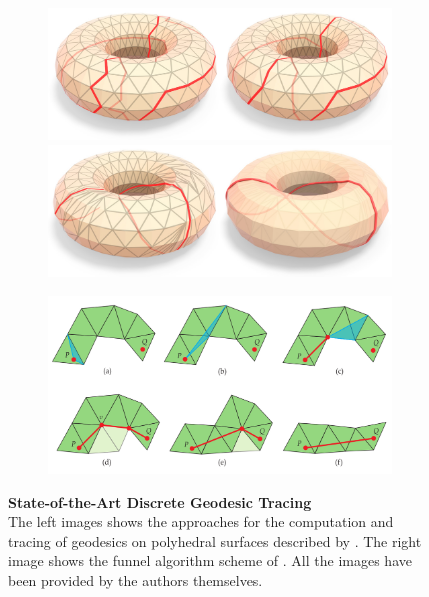 \documentclass{stdlocal}
\begin{document}
\begin{figure}[t]
  \centering
  \begin{subfigure}[b]{0.4\textwidth}
    \centering
    \begin{minipage}{\linewidth}
      \includegraphics[width=\linewidth]{images/sharp2020-2.png} \\
      \includegraphics[width=\linewidth]{images/sharp2020-1.png}
    \end{minipage}
    \caption{\textcite{sharp2020}}
  \end{subfigure}
  \begin{subfigure}[b]{0.58\textwidth}
    \centering
    \includegraphics[width=\linewidth]{images/mancinelli2022-2.png}
    \caption{\textcite{mancinelli2022}}
  \end{subfigure}
  \caption[State-of-the-Art Discrete Geodesic Tracing]{%
    \textbf{State-of-the-Art Discrete Geodesic Tracing}\\
    The left images shows the approaches for the computation and tracing of geodesics on polyhedral surfaces described by \textcite{sharp2020}.
    The right image shows the funnel algorithm scheme of \textcite{mancinelli2022}.
    All the images have been provided by the authors themselves.
  }
  \label{fig:related-work-geodesics-schemes}
\end{figure}
\end{document}
